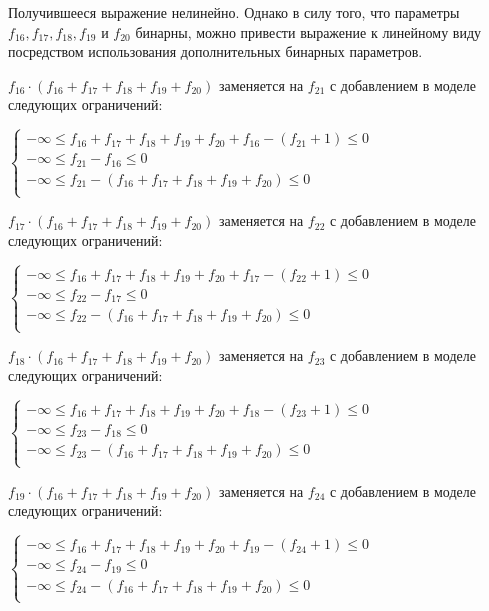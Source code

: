\begin{enumerate}
  Получившееся выражение нелинейно. Однако в силу того, что параметры $f_{16}, f_{17}, f_{18}, f_{19}$ и $f_{20}$ бинарны, можно привести выражение к линейному виду посредством использования дополнительных бинарных параметров.

  $f_{16} \cdot (f_{16} + f_{17} + f_{18} + f_{19} + f_{20})$ заменяется на $f_{21}$ с добавлением в моделе следующих ограничений:
  \begin{center}
    $
      \begin{cases}
        -\infty \le f_{16} + f_{17} + f_{18} + f_{19} + f_{20} + f_{16} - (f_{21} + 1) \le 0 \\ %
        -\infty \le f_{21} - f_{16} \le 0 \\ %
        -\infty \le f_{21} - (f_{16} + f_{17} + f_{18} + f_{19} + f_{20}) \le 0 \\ %
      \end{cases}
    $
  \end{center}

  $f_{17} \cdot (f_{16} + f_{17} + f_{18} + f_{19} + f_{20})$ заменяется на $f_{22}$ с добавлением в моделе следующих ограничений:
  \begin{center}
    $
      \begin{cases}
        -\infty \le f_{16} + f_{17} + f_{18} + f_{19} + f_{20} + f_{17} - (f_{22} + 1) \le 0 \\ %
        -\infty \le f_{22} - f_{17} \le 0 \\ %
        -\infty \le f_{22} - (f_{16} + f_{17} + f_{18} + f_{19} + f_{20}) \le 0 \\ %
      \end{cases}
    $
  \end{center}

  $f_{18} \cdot (f_{16} + f_{17} + f_{18} + f_{19} + f_{20})$ заменяется на $f_{23}$ с добавлением в моделе следующих ограничений:
  \begin{center}
    $
      \begin{cases}
        -\infty \le f_{16} + f_{17} + f_{18} + f_{19} + f_{20} + f_{18} - (f_{23} + 1) \le 0 \\ %
        -\infty \le f_{23} - f_{18} \le 0 \\ %
        -\infty \le f_{23} - (f_{16} + f_{17} + f_{18} + f_{19} + f_{20}) \le 0 \\ %
      \end{cases}
    $
  \end{center}

  $f_{19} \cdot (f_{16} + f_{17} + f_{18} + f_{19} + f_{20})$ заменяется на $f_{24}$ с добавлением в моделе следующих ограничений:
  \begin{center}
    $
      \begin{cases}
        -\infty \le f_{16} + f_{17} + f_{18} + f_{19} + f_{20} + f_{19} - (f_{24} + 1) \le 0 \\ %
        -\infty \le f_{24} - f_{19} \le 0 \\ %
        -\infty \le f_{24} - (f_{16} + f_{17} + f_{18} + f_{19} + f_{20}) \le 0 \\ %
      \end{cases}
    $
  \end{center}


\end{enumerate}
